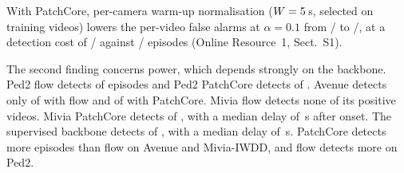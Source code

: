 With PatchCore, per-camera warm-up normalisation ($W=5{}$\,s, selected on training videos) lowers the per-video false alarms at $\alpha=0.1$ from \RFourWarmPCRawFAk{}/\RFourWarmPCRawFAn{} to \RFourWarmPCNormFAk{}/\RFourWarmPCNormFAn{}, at a detection cost of \RFourWarmPCNormDetk{}/\RFourWarmPCNormDetn{} against \RFourWarmPCRawDetk{}/\RFourWarmPCRawDetn{} episodes (Online Resource~1, Sect.~S1).

The second finding concerns power, which depends strongly on the backbone.
Ped2 flow detects \RThreePedTwoFlowDetk{} of \RThreePedTwoFlowDetn{} episodes
and Ped2 PatchCore detects \RThreePedTwoPCDetk{} of \RThreePedTwoPCDetn{}.
Avenue detects only \RThreeAvenueFlowDetk{} of \RThreeAvenueFlowDetn{} with
flow and \RThreeAvenuePCDetk{} of \RThreeAvenuePCDetn{} with PatchCore. Mivia
flow detects none of its \RThreeMiviaFlowDetn{} positive videos. Mivia
PatchCore detects \RThreeMiviaPCDetk{} of \RThreeMiviaPCDetn{}, with a median delay of
\RThreeMiviaPCDelayMed{}\,s after onset. The supervised backbone detects
\RThreeMiviaSupDetk{} of \RThreeMiviaSupDetn{}, with a median delay of
\RThreeMiviaSupDelayMed{}\,s. PatchCore detects more episodes than flow on Avenue and
Mivia-IWDD, and flow detects more on Ped2.

